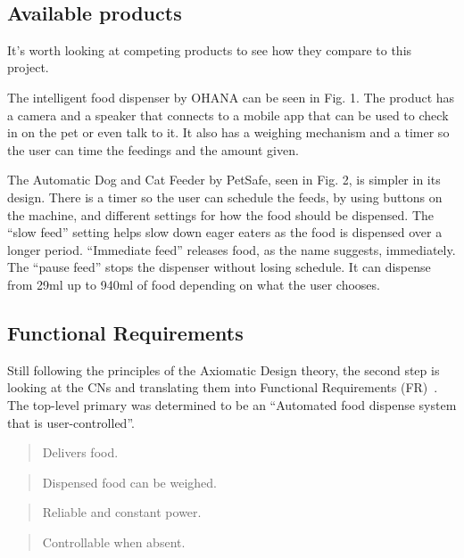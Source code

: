 \documentclass[twocolumn]{webofc}
\begin{document}
~\subsection{Available products}
It’s worth looking at competing products to see how they compare to this project.

The intelligent food dispenser by OHANA can be seen in Fig. 1.
The product has a camera and a speaker that connects to a mobile app that can be used to check in on the pet or even talk to it.
It also has a weighing mechanism and a timer so the user can time the feedings and the amount given.~\cite{ohana_dispenser}

The Automatic Dog and Cat Feeder by PetSafe, seen in Fig. 2, is simpler in its design. 
There is a timer so the user can schedule the feeds, by using buttons on the machine, and different settings for how the food should be dispensed.
The “slow feed” setting helps slow down eager eaters as the food is dispensed over a longer period.
“Immediate feed” releases food, as the name suggests, immediately. The “pause feed” stops the dispenser without losing schedule.
It can dispense from 29ml up to 940ml of food depending on what the user chooses.~\cite{pet_safe}


\subsection{Functional Requirements}
Still following the principles of the Axiomatic Design theory, the second step is looking at the CNs and translating them into Functional Requirements (FR)~\cite{suh1990principles}.
The top-level primary \textbf{} was determined to be an “Automated food dispense system that is user-controlled”.

\begin{quote} \textbf{} Delivers food.
\end{quote}
\begin{quote} \textbf{} Dispensed food can be weighed.
\end{quote}
\begin{quote} \textbf{} Reliable and constant power.
\end{quote}
\begin{quote} \textbf{} Controllable when absent.
\end{quote}
\end{document}
